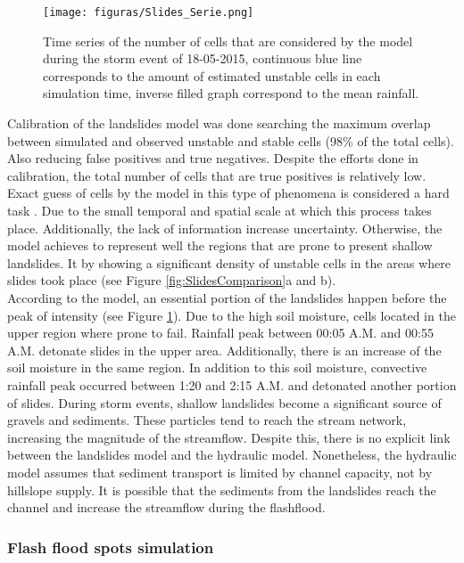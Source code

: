 {\begin{figure}[t]
\centering
 \texttt{[image: figuras/Slides\_Serie.png]}
 \caption{Time series of the number of cells that are considered by the model during the storm event of 18-05-2015, continuous blue line corresponds to the amount of estimated unstable cells in each simulation time, inverse filled graph correspond to the mean rainfall.}
    \label{fig:UnstableCellsSerie}
\end{figure}

Calibration of the landslides model was done searching the maximum overlap between simulated and observed unstable and stable cells (98\% of the total cells). Also reducing false positives and true negatives.   Despite the efforts done in calibration, the total number of cells that are true positives is relatively low. Exact guess of cells by the model in this type of phenomena is considered a hard task \citep{Aristizabal2016, Dhakal2004, Wu1995}. Due to the small temporal and spatial scale at which this process takes place. Additionally, the lack of information increase uncertainty.  Otherwise, the model achieves to represent well the regions that are prone to present shallow landslides. It by showing a significant density of unstable cells in the areas where slides took place (see Figure \ref{fig:SlidesComparison}a and b).\\

According to the model, an essential portion of the landslides happen before the peak of intensity  (see Figure \ref{fig:UnstableCellsSerie}).  Due to the high soil moisture, cells located in the upper region where prone to fail.  Rainfall peak between 00:05 A.M. and 00:55 A.M. detonate slides in the upper area.  Additionally, there is an increase of the soil moisture in the same region. In addition to this soil moisture, convective rainfall peak occurred between 1:20 and 2:15 A.M. and detonated another portion of slides.  During storm events, shallow landslides become a significant source of gravels and sediments.  These particles tend to reach the stream network, increasing the magnitude of the streamflow.  Despite this, there is no explicit link between the landslides model and the hydraulic model.  Nonetheless, the hydraulic model assumes that sediment transport is limited by channel capacity, not by hillslope supply.  It is possible that the sediments from the landslides reach the channel and increase the streamflow during the flashflood.\\ 

\subsubsection{Flash flood spots simulation}

}
